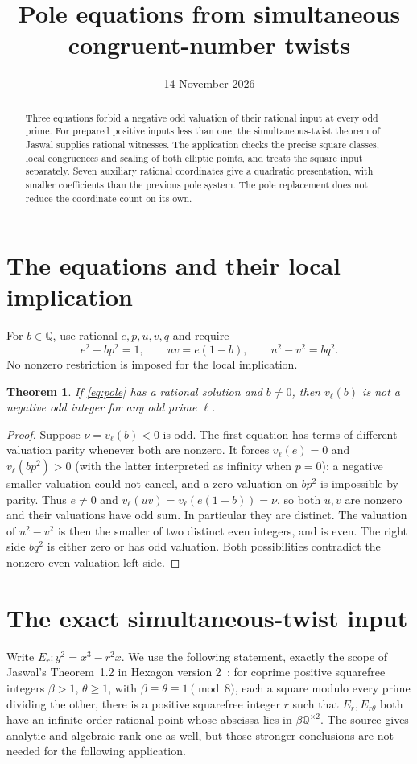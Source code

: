 \documentclass[10pt,a4paper]{article}
\title{Pole equations from simultaneous congruent-number twists}
\author{}\date{14 November 2026}
\newtheorem{theorem}{Theorem}[section]\newtheorem{lemma}[theorem]{Lemma}
\newcommand{\Q}{\mathbb Q}\newcommand{\Z}{\mathbb Z}
\begin{document}
\maketitle
\begin{abstract}
Three equations forbid a negative odd valuation of their rational input
at every odd prime. For prepared positive inputs less than one, the
simultaneous-twist theorem of Jaswal supplies rational witnesses.
The application checks the precise square classes, local congruences
and scaling of both elliptic points, and treats the square input
separately. Seven auxiliary rational coordinates give a quadratic
presentation, with smaller coefficients than the previous pole system.
The pole replacement does not reduce the coordinate count on its own.
\end{abstract}

\section{The equations and their local implication}
For $b\in\Q$, use rational $e,p,u,v,q$ and require
\begin{equation}\label{eq:pole}
 e^2+bp^2=1,\qquad uv=e(1-b),\qquad u^2-v^2=bq^2.
\end{equation}
No nonzero restriction is imposed for the local implication.

\begin{theorem}\label{thm:local}
If \eqref{eq:pole} has a rational solution and $b\ne0$, then
$v_\ell(b)$ is not a negative odd integer for any odd prime $\ell$.
\end{theorem}
\begin{proof}
Suppose $\nu=v_\ell(b)<0$ is odd. The first equation has terms of
different valuation parity whenever both are nonzero. It forces
$v_\ell(e)=0$ and $v_\ell(bp^2)>0$ (with the latter interpreted as
infinity when $p=0$): a negative smaller valuation could not cancel,
and a zero valuation on $bp^2$ is impossible by parity.
Thus $e\ne0$ and $v_\ell(uv)=v_\ell(e(1-b))=\nu$, so both $u,v$
are nonzero and their valuations have odd sum. In particular they are
distinct. The valuation of $u^2-v^2$ is then the smaller of two distinct
even integers, and is even. The right side $bq^2$ is either zero or has
odd valuation. Both possibilities contradict the nonzero even-valuation
left side.
\end{proof}

\section{The exact simultaneous-twist input}
Write $E_r:y^2=x^3-r^2x$. We use the following statement, exactly the
scope of Jaswal's Theorem~1.2 in Hexagon version 2~\cite{Jaswal}:
for coprime positive squarefree integers $\beta>1$, $\theta\ge1$,
with $\beta\equiv\theta\equiv1\pmod8$, each a square modulo every
prime dividing the other, there is a positive squarefree integer $r$
such that $E_r,E_{r\theta}$ both have an infinite-order rational point
whose abscissa lies in $\beta\Q^{\times2}$. The source gives analytic
and algebraic rank one as well, but those stronger conclusions are not
needed for the following application.
\end{document}
